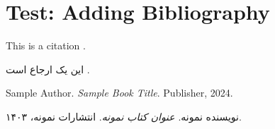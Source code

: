 \documentclass[12pt,a4paper]{article}
\newcommand{\fa}[1]{\textfarsi{#1}}
\newcommand{\en}[1]{\textenglish{#1}}
\begin{document}
\section*{Test: Adding Bibliography}

\en{This is a citation \cite{sample2024}.}

\fa{این یک ارجاع است \cite{persian2024}.}

\begin{thebibliography}{9}

\en{Sample Author.}
\en{\textit{Sample Book Title}.}
\en{Publisher, 2024.}

\fa{نویسنده نمونه.}
\fa{\textit{عنوان کتاب نمونه}.}
\fa{انتشارات نمونه، ۱۴۰۳.}

\end{thebibliography}
\end{document}
